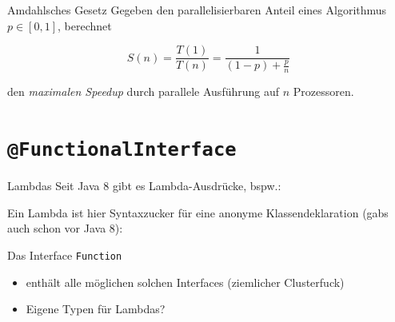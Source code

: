 \documentclass{beamer}
\newcommand{\code}[1]{
	\begin{mdframed}
		
	\end{mdframed}
}
\begin{document}
\begin{frame}{Amdahlsches Gesetz}
  Gegeben den parallelisierbaren Anteil eines Algorithmus $p \in [0, 1]$, berechnet

  \begin{equation*}
    S(n) = \frac{T(1)}{T(n)} = \frac{1}{(1 - p) + \frac{p}{n}}
  \end{equation*}

  den \emph{maximalen Speedup} durch parallele Ausführung auf $n$ Prozessoren.



\end{frame}

\section{\texttt{@FunctionalInterface}}

\begin{frame}{Lambdas}
  Seit Java 8 gibt es Lambda-Ausdrücke, bspw.:

  \code{code/funcinterface.java}

  Ein Lambda ist hier Syntaxzucker für eine anonyme Klassendeklaration (gabs auch schon vor Java 8):

  \code{code/anonymousclass.java}
\end{frame}

\begin{frame}{Das Interface \texttt{Function}}
  \code{code/function.java}

  \begin{itemize}
    \item {} enthält alle möglichen solchen Interfaces (ziemlicher Clusterfuck)
    \item Eigene Typen für Lambdas?
  \end{itemize}
\end{frame}
\end{document}
